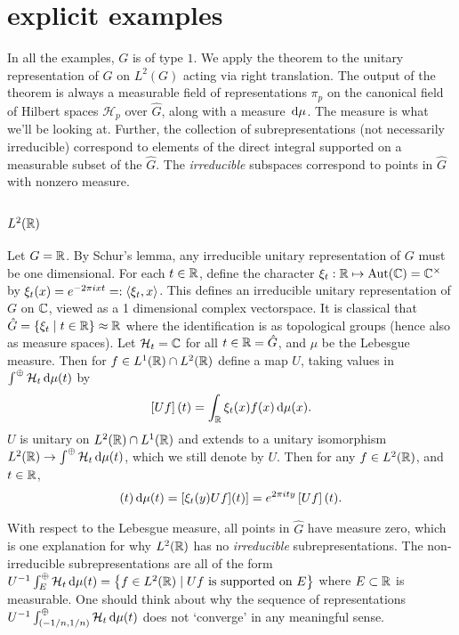 \documentclass[11pt]{amsart}
\newcommand{\hsp}{\hspace{1mm}}
\renewcommand{\H}{\mathcal{H}}
\newcommand{\set}[2]{\left\{ #1 \hsp| \hsp #2\right\}}
\begin{document}
\section{explicit examples}
In all the examples, $G$ is of type $1$. We apply the theorem to the unitary representation of $G$ on $L^{2}(G)$ acting via right translation. The output of the theorem is always a measurable field of representations $\pi_{p}$ on the canonical field of Hilbert spaces $\H_{p}$ over $\hat{G}$, along with a measure $\,{\rm d} \mu$. The measure is what we'll be looking at. Further, the collection of subrepresentations (not necessarily irreducible) correspond to elements of the direct integral supported on a measurable subset of the $\hat{G}$. The \emph{irreducible} subspaces correspond to points in $\hat{G}$ with nonzero measure. 
\subsection{$L^{2}(\mathbb{R})$} 
Let $G=\mathbb{R}$.  By Schur's lemma, any irreducible unitary representation of $G$ must be one dimensional. For each $t \in \mathbb{R}$, define the character $\xi_{t}: \mathbb{R}\mapsto \operatorname{Aut}(\mathbb{C})=\mathbb{C}^{\times}$ by $\xi_{t}(x)=e^{-2\pi i x t}=:\langle \xi_{t}, x \rangle$. This defines an irreducible unitary representation of $G$ on $\mathbb{C}$, viewed as a 1 dimensional complex vectorspace. It is classical that $\hat{G}=\set{\xi_{t}}{t\in \R}\approx \R$ where the identification is as topological groups (hence also as measure spaces). Let $\H_{t}=\C$ for all $t\in \mathbb{R}=\hat{G}$, and $\mu$ be the Lebesgue measure. Then for $f\in L^{1}(\mathbb{R})\cap L^{2}(\mathbb{R})$ define a map $U$, taking values in $\int^{\oplus}\H_{t}\dop \mu(t)$ by
	\begin{align}\label{eq:1}
		\left[Uf\right](t)=\int_{\mathbb{R}}\xi_{t}(x)f(x)\,{\rm d} \mu(x).
	\end{align}
$U$ is unitary on $L^{2}(\mathbb{R})\cap L^{1}(\mathbb{R})$ and extends to a unitary isomorphism $L^{2}(\R)\to \int^{\oplus}\H_{t}\dop \mu(t)$, which we still denote by $U$.  Then for any $f\in L^{2}(\mathbb{R})$,  and $t\in \mathbb{R}$,
	\begin{align*}
		[UR_{y}f][(t)= \int^{\oplus}\xi_{t}(y)\left[Uf\right](t)\dop \mu (t) =\left[ \xi_{t}(y)Uf](t)\right]= e^{2\pi i t y}\left[Uf\right](t).
	\end{align*}

\par With respect to the Lebesgue measure, all points in $\hat{G}$ have measure zero, which is one explanation for why $L^{2}(\mathbb{R})$ has no \emph{irreducible} subrepresentations. The non-irreducible subrepresentations are all of the form $U^{-1}\int^{\oplus}_{E}\H_{t}\dop \mu (t)=\set{f\in L^{2}(\R)}{Uf \text{ is supported on $E$}}$ where $E\subset \mathbb{R}$ is measurable. One should think about why the sequence of representations $U^{-1}\int^{\oplus}_{(-1/n,1/n)}\H_{t}\dop \mu (t)$ does not `converge' in any meaningful sense.
\end{document}
